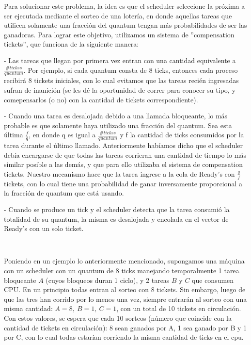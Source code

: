 Para solucionar este problema, la idea es que el scheduler seleccione la próxima a ser ejecutada mediante el sorteo de una lotería, en donde aquellas tareas que utilicen solamente una fracción del quantum
tengan más probabilidades de ser las ganadoras. Para lograr este objetivo, utilizamos un sistema de ''compensation tickets'', que funciona de la siguiente manera:

- Las tareas que llegan por primera vez entran con una cantidad equivalente a $\frac{\#tickss}{quantum}$. Por ejemplo, si cada quantum consta de 8 ticks, entonces cada
proceso recibirá 8 tickets iniciales, con lo cual evitamos que las tareas recién ingresadas sufran de inanición (se les dé la oportunidad de correr para conocer su tipo, 
y comepensarlos (o no) con la cantidad de tickets correspondiente).

- Cuando una tarea es desalojada debido a una llamada bloqueante, lo más probable es que solamente haya utilizado una fracción del quantum. Sea esta última $\frac{f}{q}$,
en donde q es igual a $\frac{\#tickss}{quantum}$ y f la cantidad de ticks consumidos por la tarea durante el último llamado.
Anteriormente habíamos dicho que el scheduler debía encargarse de que todas las tareas corrieran una cantidad de tiempo lo más similar posible a las demás, y que para ello utilizaba
el sistema de compensation tickets. Nuestro mecanismo hace que la tarea ingrese a la cola de Ready's con $\frac{q}{f}$ tickets, con lo cual tiene una probabilidad de ganar
inversamente proporcional a la fracción de quantum que está usando.

- Cuando se produce un tick y el scheduler detecta que la tarea consumió la totalidad de su quantum, la misma es desalojada y encolada en el vector de Ready's con un solo ticket.

~


Poniendo en un ejemplo lo anteriormente mencionado, supongamos una máquina con un scheduler con
un quantum de 8 ticks manejando temporalmente 
1 tarea bloqueante $A$ (cuyos bloqueos duran 1 ciclo), y 2 tareas $B$ y $C$ que consumen CPU. En un principio todas entran al sorteo con 8
tickets. Sin embargo, luego de que las tres han corrido por lo menos una vez, siempre entrarán al sorteo con una misma cantidad: $A=8, \ B=1, \ C=1$, con un total de
10 tickets en circulación. Con estos valores, se espera que cada 10 sorteos (número que coincide con la cantidad de tickets en circulación): 8 sean ganados por A,
1 sea ganado por B y 1 por C, con lo cual todas estarían corriendo la misma cantidad de ticks en el cpu. 

